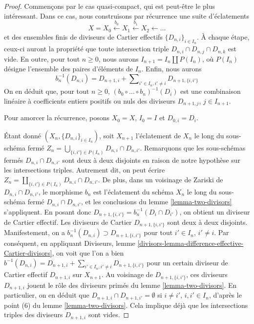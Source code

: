 \begin{proof}
Commençons par le cas quasi-compact, qui est peut-être
le plus intéressant. Dans ce cas, nous construisons par récurrence une suite
d'éclatements
$$
X = X_0 \xleftarrow{b_0} X_1 \xleftarrow{b_1} X_2 \leftarrow \ldots
$$
et des ensembles finis de diviseurs de Cartier effectifs $\{D_{n, i}\}_{i \in I_n}$.
À chaque étape, ceux-ci auront la propriété que toute intersection triple
$D_{n, i} \cap D_{n, j} \cap D_{n, k}$ est vide.
En outre, pour tout $n \geq 0$, nous aurons
$I_{n + 1} = I_n \amalg P(I_n)$, où $P(I_n)$ désigne
l'ensemble des paires d'éléments de $I_n$. Enfin, nous aurons
$$
b_n^{-1}(D_{n, i}) = D_{n + 1, i} +
\sum\nolimits_{i' \in I_n, i' \not = i} D_{n + 1, \{i, i'\}}
$$
On en déduit que, pour tout $n \geq 0$,
$(b_0 \circ \ldots \circ b_n)^{-1}(D_i)$ est une combinaison linéaire
à coefficients entiers positifs ou nuls des diviseurs $D_{n + 1, j}$, $j \in I_{n + 1}$.

\medskip\noindent
Pour amorcer la récurrence, posons $X_0 = X$,
$I_0 = I$ et $D_{0, i} = D_i$.

\medskip\noindent
Étant donné $(X_n, \{D_{n, i}\}_{i \in I_n})$, soit $X_{n + 1}$
l'éclatement de $X_n$ le long du sous-schéma fermé
$Z_n = \bigcup_{\{i, i'\} \in P(I_n)} D_{n, i} \cap D_{n, i'}$.
Remarquons que les sous-schémas fermés $D_{n, i} \cap D_{n, i'}$ sont deux à deux
disjoints en raison de notre hypothèse sur les intersections triples.
Autrement dit, on peut écrire
$Z_n = \coprod_{\{i, i'\} \in P(I_n)} D_{n, i} \cap D_{n, i'}$.
De plus, dans un voisinage de Zariski de $D_{n, i} \cap D_{n, i'}$, le
morphisme $b_n$ est l'éclatement du schéma $X_n$
le long du sous-schéma fermé $D_{n, i} \cap D_{n, i'}$, et les conclusions
du lemme \ref{lemma-two-divisors} s'appliquent.
En posant donc $D_{n + 1, \{i, i'\}} = b_n^{-1}(D_i \cap D_{i'})$,
on obtient un diviseur de Cartier effectif.
Les diviseurs de Cartier $D_{n + 1, \{i, i'\}}$ sont deux à deux disjoints.
Manifestement, on a
$b_n^{-1}(D_{n, i}) \supset D_{n + 1, \{i, i'\}}$ pour
tout $i' \in I_n$, $i' \not = i$. Par conséquent, en appliquant
Diviseurs, lemme \ref{divisors-lemma-difference-effective-Cartier-divisors},
on voit que l'on a bien $b^{-1}(D_{n, i}) = D_{n + 1, i} +
\sum\nolimits_{i' \in I_n, i' \not = i} D_{n + 1, \{i, i'\}}$
pour un certain diviseur de Cartier effectif $D_{n + 1, i}$ sur $X_{n + 1}$.
Au voisinage de $D_{n + 1, \{i, i'\}}$, ces diviseurs
$D_{n + 1, i}$ jouent le rôle des diviseurs primés du
lemme \ref{lemma-two-divisors}. En particulier, on en déduit que
$D_{n + 1, i} \cap D_{n + 1, i'} = \emptyset$ si $i \not = i'$,
$i, i' \in I_n$, d'après le point (6) du lemme \ref{lemma-two-divisors}.
Cela implique déjà que les intersections triples
des diviseurs $D_{n + 1, i}$ sont vides.


\end{proof}
